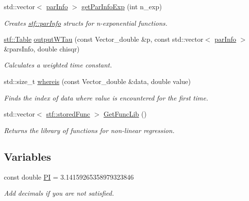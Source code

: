 \begin{DoxyCompactItemize}
std::vector$<$ \hyperlink{structstf_1_1parInfo}{parInfo} $>$ \hyperlink{group__stfgen_gaa535878b74675e92a48e0e20a7e6b1a6}{getParInfoExp} (int n\_\-exp)
\begin{DoxyCompactList}\small\item\em Creates \hyperlink{structstf_1_1parInfo}{stf::parInfo} structs for n-\/exponential functions. \item\end{DoxyCompactList}\item 
\hyperlink{classstf_1_1Table}{stf::Table} \hyperlink{group__stfgen_ga62fd233e1b8aaa7e71bcc639793b3c93}{outputWTau} (const Vector\_\-double \&p, const std::vector$<$ \hyperlink{structstf_1_1parInfo}{parInfo} $>$ \&parsInfo, double chisqr)
\begin{DoxyCompactList}\small\item\em Calculates a weighted time constant. \item\end{DoxyCompactList}\item 
std::size\_\-t \hyperlink{group__stfgen_ga7fa85af19cf73937c166e0fa1aad7955}{whereis} (const Vector\_\-double \&data, double value)
\begin{DoxyCompactList}\small\item\em Finds the index of {\itshape data\/} where {\itshape value\/} is encountered for the first time. \item\end{DoxyCompactList}\item 
std::vector$<$ \hyperlink{structstf_1_1storedFunc}{stf::storedFunc} $>$ \hyperlink{group__stfgen_ga14b43f4510558137aac70408cd1c036b}{GetFuncLib} ()
\begin{DoxyCompactList}\small\item\em Returns the library of functions for non-\/linear regression. \item\end{DoxyCompactList}\end{DoxyCompactItemize}
\subsection*{Variables}
\begin{DoxyCompactItemize}
\item 
\hypertarget{group__stfgen_ga5b9c4776a431231a9db345759e7de8ae}{
const double \hyperlink{group__stfgen_ga5b9c4776a431231a9db345759e7de8ae}{PI} = 3.14159265358979323846}
\label{group__stfgen_ga5b9c4776a431231a9db345759e7de8ae}

\begin{DoxyCompactList}\small\item\em Add decimals if you are not satisfied. \item\end{DoxyCompactList}\end{DoxyCompactItemize}


